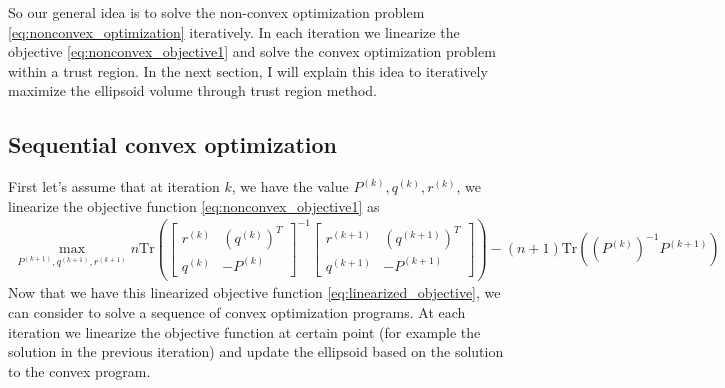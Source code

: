 \documentclass{article}
\begin{document}
So our general idea is to solve the non-convex optimization problem \eqref{eq:nonconvex_optimization} iteratively. In each iteration we linearize the objective \eqref{eq:nonconvex_objective1} and solve the convex optimization problem within a trust region. In the next section, I will explain this idea to iteratively maximize the ellipsoid volume through trust region method.

\subsection{Sequential convex optimization}
First let's assume that at iteration $k$, we have the value $P^{(k)}, q^{(k)}, r^{(k)}$, we linearize the objective function \eqref{eq:nonconvex_objective1} as
\begin{align}
	\max_{P^{(k+1)}, q^{(k+1)}, r^{(k+1)}} n\text{Tr}\left(\begin{bmatrix}r^{(k)} &(q^{(k)})^T\\q^{(k)} & -P^{(k)}\end{bmatrix}^{-1}\begin{bmatrix} r^{(k+1)} & (q^{(k+1)})^T\\q^{(k+1)} & -P^{(k+1)}\end{bmatrix}\right) - (n+1)\text{Tr}\left((P^{(k)})^{-1} P^{(k+1)}\right)
	\label{eq:linearized_objective}
\end{align}
Now that we have this linearized objective function \eqref{eq:linearized_objective}, we can consider to solve a sequence of convex optimization programs. At each iteration we linearize the objective function at certain point (for example the solution in the previous iteration) and update the ellipsoid based on the solution to the convex program.



\end{document}

